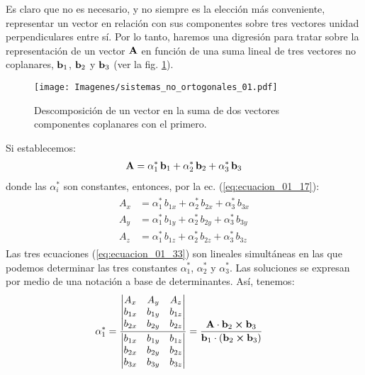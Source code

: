 Es claro que no es necesario, y no siempre es la elección más conveniente, representar un vector en relación con sus componentes sobre tres vectores unidad perpendiculares entre sí. Por lo tanto, haremos una digresión para tratar sobre la representación de un vector $\vb{A}$ en función de una suma lineal de tres vectores no coplanares, $\vb{b}_{1}$, $\vb{b}_{2}$ y $\vb{b}_{3}$ (ver la fig. \ref{fig:figura_01_12}). 
\begin{figure}[H]
    \centering
    \texttt{[image: Imagenes/sistemas\_no\_ortogonales\_01.pdf]}
    \caption{Descomposición de un vector en la suma de dos vectores \\ \centering componentes coplanares con el primero.}
    \label{fig:figura_01_12}
\end{figure}
Si establecemos:
\begin{align}
    \vb{A} = \alpha_{1}^{*} \, \vb{b}_{1} + \alpha_{2}^{*} \, \vb{b}_{2} + \alpha_{3}^{*} \, \vb{b}_{3}
    \label{eq:ecuacion_01_32}
\end{align}
donde las $\alpha_{i}^{*}$ son constantes, entonces, por la ec. (\ref{eq:ecuacion_01_17}):
\begin{align}
\begin{aligned}
A_{x} &= \alpha_{1}^{*} \, b_{1x} + \alpha_{2}^{*} \, b_{2x} + \alpha_{3}^{*} \, b_{3x} \\[0.5em]
A_{y} &= \alpha_{1}^{*} \, b_{1y} + \alpha_{2}^{*} \, b_{2y} + \alpha_{3}^{*} \, b_{3y} \\[0.5em]
A_{z} &= \alpha_{1}^{*} \, b_{1z} + \alpha_{2}^{*} \, b_{2z} + \alpha_{3}^{*} \, b_{3z}
\end{aligned}
\label{eq:ecuacion_01_33}
\end{align}
Las tres ecuaciones (\ref{eq:ecuacion_01_33}) son lineales simultáneas en las que podemos determinar las tres constantes $\alpha_{1}^{*}$, $\alpha_{2}^{*}$ y $\alpha_{3}^{*}$. Las soluciones se expresan por medio de una notación a base de determinantes. Así, tenemos:
\begin{align}
\alpha_{1}^{*} &= \dfrac{\mdet{
    A_{x} & A_{y} & A_{z} \\
    b_{1x} & b_{1y} & b_{1z} \\
    b_{2x} & b_{2y} & b_{2z}}}{\mdet{
    b_{1x} & b_{1y} & b_{1z} \\
    b_{2x} & b_{2y} & b_{2z} \\
    b_{3x} & b_{3y} & b_{3z}}} =
    \dfrac{\vb{A} \cdot \vb{b}_{2} \cp \vb{b}_{3}}{\vb{b}_{1} \cdot \left( \vb{b}_{2} \cp \vb{b}_{3} \right)}
    \label{eq:ecuacion_01_34}
\end{align}

